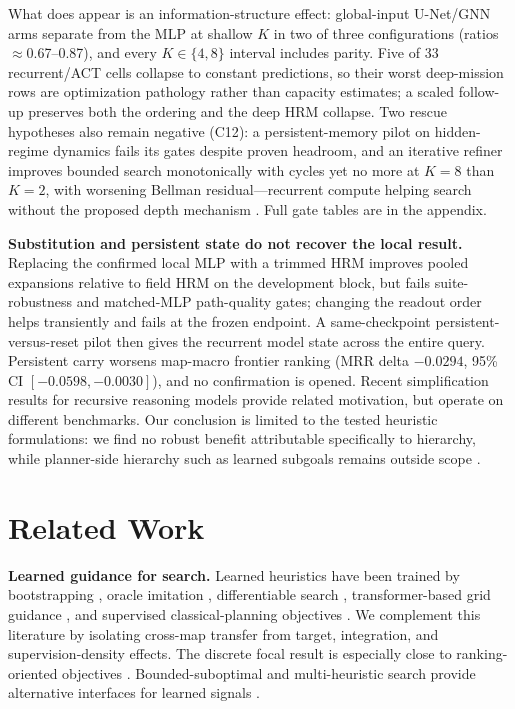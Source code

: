 \documentclass[letterpaper]{article} %
\newcommand{\stage}[1]{\textsc{#1}}
\begin{document}
What does appear is an information-structure effect: global-input U-Net/GNN arms separate from the MLP at shallow $K$ in two of three configurations (ratios $\approx$0.67--0.87), and every $K\in\{4,8\}$ interval includes parity. Five of 33 recurrent/ACT cells collapse to constant predictions, so their worst deep-mission rows are optimization pathology rather than capacity estimates; a scaled follow-up preserves both the ordering and the deep HRM collapse. Two rescue hypotheses also remain negative (\stage{C12}): a persistent-memory pilot on hidden-regime dynamics fails its gates despite proven headroom, and an iterative refiner improves bounded search monotonically with cycles yet no more at $K{=}8$ than $K{=}2$, with worsening Bellman residual---recurrent compute helping search without the proposed depth mechanism \citep{tamar2016vin,lee2018gppn}. Full gate tables are in the appendix.

\textbf{Substitution and persistent state do not recover the local result.} Replacing the confirmed local MLP with a trimmed HRM improves pooled expansions relative to field HRM on the development block, but fails suite-robustness and matched-MLP path-quality gates; changing the readout order helps transiently and fails at the frozen endpoint. A same-checkpoint persistent-versus-reset pilot then gives the recurrent model state across the entire query. Persistent carry worsens map-macro frontier ranking (MRR delta $-0.0294$, 95\% CI $[-0.0598,-0.0030]$), and no confirmation is opened. Recent simplification results for recursive reasoning models \citep{jolicoeur2025trm} provide related motivation, but operate on different benchmarks. Our conclusion is limited to the tested heuristic formulations: we find no robust benefit attributable specifically to hierarchy, while planner-side hierarchy such as learned subgoals remains outside scope \citep{czechowski2021subgoal}.

\section{Related Work}

\textbf{Learned guidance for search.} Learned heuristics have been trained by bootstrapping \citep{arfaee2011bootstrap}, oracle imitation \citep{bhardwaj2017sail}, differentiable search \citep{yonetani2021neuralastar}, transformer-based grid guidance \citep{kirilenko2023transpath}, and supervised classical-planning objectives \citep{ferber2020neural}. We complement this literature by isolating cross-map transfer from target, integration, and supervision-density effects. The discrete focal result is especially close to ranking-oriented objectives \citep{chrestien2023rank}. Bounded-suboptimal and multi-heuristic search provide alternative interfaces for learned signals \citep{pohl1970,pearl1982semiadmissible,aine2016mha}.
\end{document}
